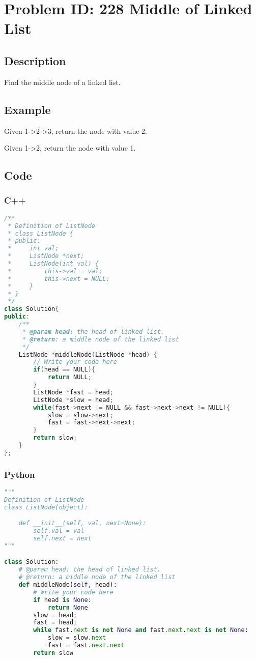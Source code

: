 \section{Problem ID: 228 Middle of Linked List}
\subsection{Description}
Find the middle node of a linked list.

\subsection{Example}
Given 1->2->3, return the node with value 2.

Given 1->2, return the node with value 1.

\subsection{Code}
\scriptsize
\subsubsection{C++}
\begin{lstlisting}[language=C++]
/**
 * Definition of ListNode
 * class ListNode {
 * public:
 *     int val;
 *     ListNode *next;
 *     ListNode(int val) {
 *         this->val = val;
 *         this->next = NULL;
 *     }
 * }
 */
class Solution{
public:
    /**
     * @param head: the head of linked list.
     * @return: a middle node of the linked list
     */
    ListNode *middleNode(ListNode *head) {
        // Write your code here
        if(head == NULL){
            return NULL;
        }
        ListNode *fast = head;
        ListNode *slow = head;
        while(fast->next != NULL && fast->next->next != NULL){
            slow = slow->next;
            fast = fast->next->next;
        }
        return slow;
    }
};
\end{lstlisting}

\subsubsection{Python}
\begin{lstlisting}[language=Python]
"""
Definition of ListNode
class ListNode(object):

    def __init__(self, val, next=None):
        self.val = val
        self.next = next
"""

class Solution:
    # @param head: the head of linked list.
    # @return: a middle node of the linked list
    def middleNode(self, head):
        # Write your code here
        if head is None:
            return None
        slow = head;
        fast = head;
        while fast.next is not None and fast.next.next is not None:
            slow = slow.next
            fast = fast.next.next
        return slow
\end{lstlisting}
\normalsize 